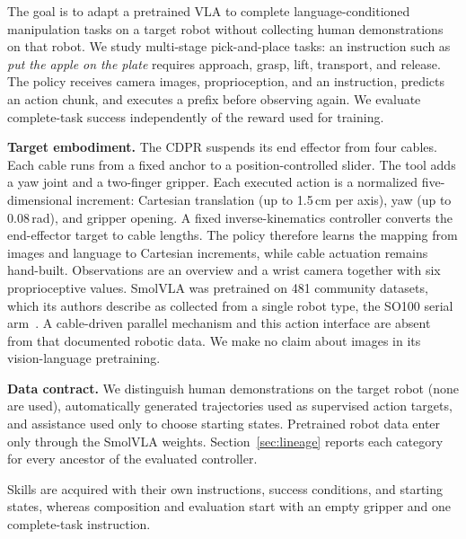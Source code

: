 The goal is to adapt a pretrained VLA to complete language-conditioned manipulation tasks on a target robot without collecting human demonstrations on that robot. We study multi-stage pick-and-place tasks: an instruction such as \emph{put the apple on the plate} requires approach, grasp, lift, transport, and release. The policy receives camera images, proprioception, and an instruction, predicts an action chunk, and executes a prefix before observing again. We evaluate complete-task success independently of the reward used for training.

\textbf{Target embodiment.} The CDPR suspends its end effector from four cables. Each cable runs from a fixed anchor to a position-controlled slider. The tool adds a yaw joint and a two-finger gripper. Each executed action is a normalized five-dimensional increment: Cartesian translation (up to 1.5\,cm per axis), yaw (up to 0.08\,rad), and gripper opening. A fixed inverse-kinematics controller converts the end-effector target to cable lengths. The policy therefore learns the mapping from images and language to Cartesian increments, while cable actuation remains hand-built. Observations are an overview and a wrist camera together with six proprioceptive values. SmolVLA was pretrained on 481 community datasets, which its authors describe as collected from a single robot type, the SO100 serial arm~\cite{smolvla}. A cable-driven parallel mechanism and this action interface are absent from that documented robotic data. We make no claim about images in its vision-language pretraining.

\textbf{Data contract.} We distinguish human demonstrations on the target robot (none are used), automatically generated trajectories used as supervised action targets, and assistance used only to choose starting states. Pretrained robot data enter only through the SmolVLA weights. Section~\ref{sec:lineage} reports each category for every ancestor of the evaluated controller.

Skills are acquired with their own instructions, success conditions, and starting states, whereas composition and evaluation start with an empty gripper and one complete-task instruction.
